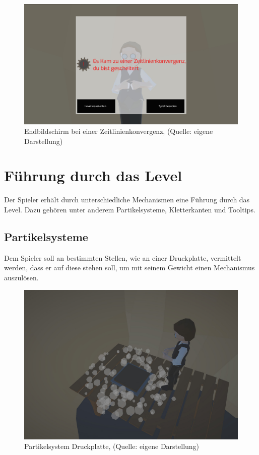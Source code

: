 \begin{figure}[ht]
\centering
\includegraphics[width=1\linewidth]{content/pictures/DeathScreen.jpg}
\caption{Endbildschirm bei einer Zeitlinienkonvergenz, (Quelle: eigene Darstellung)}
\label{fig:deathscreen}
\end{figure}

\newpage
\section{Führung durch das Level}\label{sec:level-integrated-huds}
Der Spieler erhält durch unterschiedliche Mechanismen eine Führung durch das Level. Dazu gehören unter anderem Partikelsysteme, Kletterkanten und Tooltips.
\subsection{Partikelsysteme}\label{sec:particle-system}
Dem Spieler soll an bestimmten Stellen, wie an einer Druckplatte, vermittelt werden, dass er auf diese stehen soll, um mit seinem Gewicht einen Mechanismus auszulösen.

\begin{figure}[ht]
\centering
\includegraphics[width=0.8\linewidth]{content/pictures/Pressureplate_tooltip.jpg}
\caption{Partikelsystem Druckplatte, (Quelle: eigene Darstellung)}
\label{fig:pressureplate_tooltip}
\end{figure}


